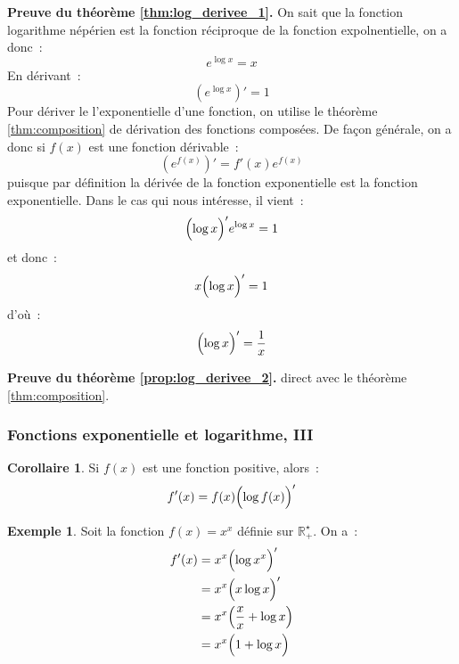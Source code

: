 \documentclass[10pt,notheorems]{beamer}
\theoremstyle{plain}
\theoremstyle{definition} %
\newtheorem{example}{Exemple}
\newtheorem{corollary}{Corollaire}%
\begin{document}
\begin{notes}

  \textbf{Preuve du théorème \hyperlink{slide_derivee_exp_log_1}{\ref{thm:log_derivee_1}}.} On sait que la fonction logarithme népérien est la fonction réciproque de la fonction expolnentielle, on a donc~:
  \[
    e^{\log x} = x
  \]
  En dérivant~:
  \[
    \left(e^{\log x}\right)' = 1
  \]
  Pour dériver le l'exponentielle d'une fonction, on utilise le théorème \hyperlink{slide_derivee_composition_1}{\ref{thm:composition}} de dérivation des fonctions composées. De façon générale, on a donc si $f(x)$ est une fonction dérivable~:
  \[
    \left(e^{f(x)}\right)' = f'(x)e^{f(x)}
  \]
  puisque par définition la dérivée de la fonction exponentielle est la fonction exponentielle. Dans le cas qui nous intéresse, il vient~:
  \[
    \Bigl( \log x \Bigr)' e^{\log x} = 1
  \]
  et donc~:
  \[
    x \Bigl( \log x \Bigr)' = 1
  \]
  d'où~:
  \[
    \Bigl( \log x \Bigr)' = \frac{1}{x}
  \]

  \bigskip

  \textbf{Preuve du théorème \hyperlink{slide_derivee_exp_log_1}{\ref{prop:log_derivee_2}}.} direct avec le théorème \hyperlink{slide_derivee_composition_1}{\ref{thm:composition}}.

\end{notes}


\begin{frame}
  \frametitle{Fonctions exponentielle et logarithme, III}
  \hypertarget{slide_derivee_exp_log_1}{}

  \bigskip

  \begin{corollary}
    Si $f(x)$ est une fonction positive, alors~:
    \[
      f'(x) = f(x) \Bigl(\log f(x)\Bigr)'
    \]
  \end{corollary}

  \bigskip

  \begin{example}
    Soit la fonction $f(x) = x^x$ définie sur $\mathbb R_+^{\star}$. On a~:
    \[
      \begin{split}
        f'(x) &= x^x \Bigl(\log x^x\Bigr)'\\
        &= x^x \Bigl(x\log x\Bigr)'\\
        &= x^x \Bigl(\frac{x}{x}+\log x\Bigr)\\
        &= x^x \Bigl(1+\log x\Bigr)
      \end{split}
    \]
  \end{example}

\end{frame}
\end{document}
